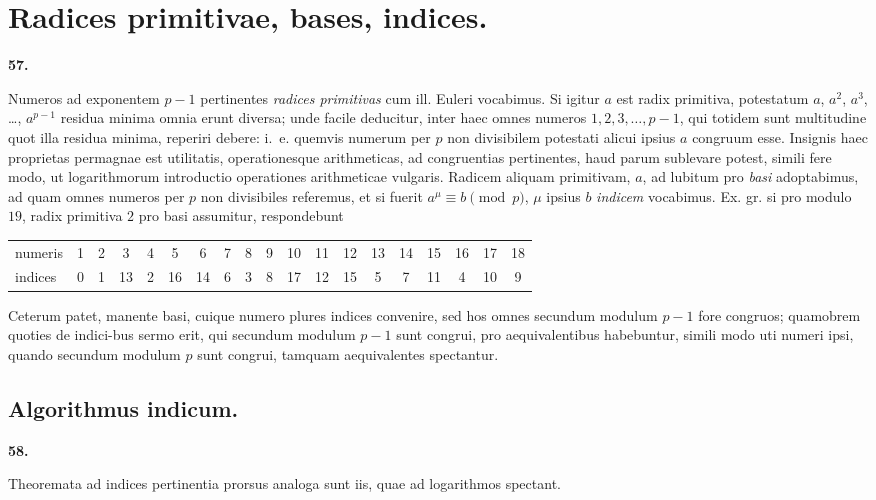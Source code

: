 \documentclass[12pt,a4paper]{article}
\theoremstyle{plain}
\theoremstyle{definition}
\theoremstyle{remark}
\begin{document}
\section*{Radices primitivae, bases, indices.}

\setcounter{satz}{57}
\addtocounter{satz}{-1}
\textbf{57.}

Numeros ad exponentem $p-1$ pertinentes \emph{radices primitivas} cum ill. Euleri vocabimus. Si igitur $a$ est radix primitiva, potestatum $a$, $a^2$, $a^3$, \ldots, $a^{p-1}$ residua minima omnia erunt diversa; unde facile deducitur, inter haec omnes numeros $1, 2, 3, \ldots, p-1$, qui totidem sunt multitudine quot illa residua minima, reperiri debere: i.~e. quemvis numerum per $p$ non divisibilem potestati alicui ipsius $a$ congruum esse. Insignis haec proprietas permagnae est utilitatis, operationesque arithmeticas, ad congruentias pertinentes, haud parum sublevare potest, simili fere modo, ut logarithmorum introductio operationes arithmeticae vulgaris. Radicem aliquam primitivam, $a$, ad lubitum pro \emph{basi} adoptabimus, ad quam omnes numeros per $p$ non divisibiles referemus, et si fuerit $a^\mu \equiv b \pmod{p}$, $\mu$ ipsius $b$ \emph{indicem} vocabimus. Ex. gr. si pro modulo $19$, radix primitiva $2$ pro basi assumitur, respondebunt

\begin{center}
\begin{tabular}{l|cccccccccccccccccc}
numeris & 1 & 2 & 3 & 4 & 5 & 6 & 7 & 8 & 9 & 10 & 11 & 12 & 13 & 14 & 15 & 16 & 17 & 18 \\
indices & 0 & 1 & 13 & 2 & 16 & 14 & 6 & 3 & 8 & 17 & 12 & 15 & 5 & 7 & 11 & 4 & 10 & 9
\end{tabular}
\end{center}

Ceterum patet, manente basi, cuique numero plures indices convenire, sed hos omnes secundum modulum $p-1$ fore congruos; quamobrem quoties de indici-bus sermo erit, qui secundum modulum $p-1$ sunt congrui, pro aequivalentibus habebuntur, simili modo uti numeri ipsi, quando secundum modulum $p$ sunt congrui, tamquam aequivalentes spectantur.

\subsection*{Algorithmus indicum.}

\setcounter{satz}{58}
\addtocounter{satz}{-1}
\textbf{58.}

Theoremata ad indices pertinentia prorsus analoga sunt iis, quae ad logarithmos spectant.
\end{document}
